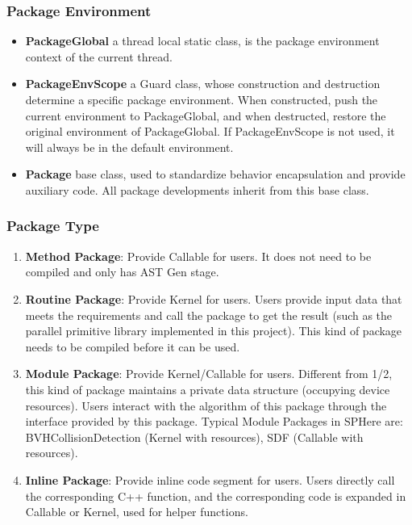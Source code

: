 \begin{frame}
    \frametitle{Package Environment}
    \begin{itemize}
        \item \textbf{PackageGlobal} a thread local static class, is the package environment context of the current thread.
        \item \textbf{PackageEnvScope} a Guard class, whose construction and destruction determine a specific package environment. When constructed, push the current environment to PackageGlobal, and when destructed, restore the original environment of PackageGlobal. If PackageEnvScope is not used, it will always be in the default environment.
        \item \textbf{Package} base class, used to standardize behavior encapsulation and provide auxiliary code. All package developments inherit from this base class.
    \end{itemize}
\end{frame}

\begin{frame}
    \frametitle{Package Type}
    \begin{enumerate}
        \item \textbf{Method Package}: Provide Callable for users. It does not need to be compiled and only has AST Gen stage.
        \item \textbf{Routine Package}: Provide Kernel for users. Users provide input data that meets the requirements and call the package to get the result (such as the parallel primitive library implemented in this project). This kind of package needs to be compiled before it can be used.
        \item \textbf{Module Package}: Provide Kernel/Callable for users. Different from 1/2, this kind of package maintains a private data structure (occupying device resources). Users interact with the algorithm of this package through the interface provided by this package. Typical Module Packages in SPHere are: BVHCollisionDetection (Kernel with resources), SDF (Callable with resources).
        \item \textbf{Inline Package}: Provide inline code segment for users. Users directly call the corresponding C++ function, and the corresponding code is expanded in Callable or Kernel, used for helper functions.
    \end{enumerate}
\end{frame}

